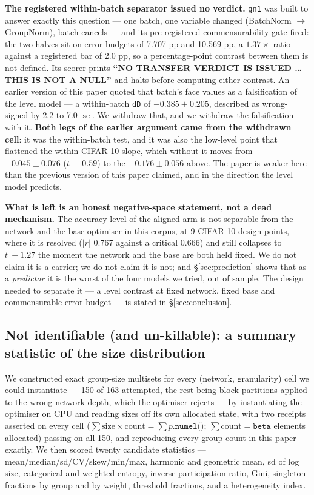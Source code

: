 \documentclass[10pt,letterpaper]{article}
\newcommand{\arm}[1]{\texttt{#1}}
\DeclareMathOperator{\se}{se}
\begin{document}
\textbf{The registered within-batch separator issued no verdict.} \arm{gn1} was built to answer
exactly this question --- one batch, one variable changed (BatchNorm $\rightarrow$ GroupNorm),
batch cancels --- and its pre-registered commensurability gate fired: the two halves sit on error
budgets of 7.707 pp and 10.569 pp, a $1.37\times$ ratio against a registered bar of 2.0 pp, so a
percentage-point contrast between them is not defined. Its scorer prints \textbf{``NO TRANSFER
VERDICT IS ISSUED \ldots{} THIS IS NOT A NULL''} and halts before computing either contrast. An
earlier version of this paper quoted that batch's face values as a falsification of the level
model --- a within-batch \texttt{dD} of $-0.385 \pm 0.205$, described as wrong-signed by 2.2 to
7.0 $\se$. We withdraw that, and we withdraw the falsification with it. \textbf{Both legs of the
earlier argument came from the withdrawn cell}: it was the within-batch test, and it was also the
low-level point that flattened the within-CIFAR-10 slope, which without it moves from
$-0.045 \pm 0.076$ ($t\ -0.59$) to the $-0.176 \pm 0.056$ above. The paper is weaker here than the
previous version of this paper claimed, and in the direction the level model predicts.

\textbf{What is left is an honest negative-space statement, not a dead mechanism.} The accuracy
level of the aligned arm is not separable from the network and the base optimiser in this corpus,
at 9 CIFAR-10 design points, where it is resolved ($|r|$ 0.767 against a critical 0.666) and
still collapses to $t\ -1.27$ the moment the network and the base are both held fixed. We do not
claim it is a carrier; we do
not claim it is not; and \S\ref{sec:prediction} shows that as a \emph{predictor} it is the worst
of the four models we tried, out of sample. The design needed to separate it --- a level contrast
at fixed network, fixed base and commensurable error budget --- is stated in
\S\ref{sec:conclusion}.

\subsection{Not identifiable (and un-killable): a summary statistic of the size distribution}
\label{sec:identifiability}

We constructed exact group-size multisets for every (network, granularity) cell we could
instantiate --- 150 of 163 attempted, the rest being block partitions applied to the wrong network
depth, which the optimiser rejects --- by instantiating the optimiser on CPU and reading sizes off
its own allocated state, with two receipts asserted on every cell
($\sum \text{size} \times \text{count} = \sum p.\texttt{numel()}$;
$\sum \text{count} = \texttt{beta}$ elements allocated) passing on all 150, and reproducing every
group count in this paper exactly. We then scored twenty candidate statistics ---
mean/median/sd/CV/skew/min/max, harmonic and geometric mean, sd of log size, categorical and
weighted entropy, inverse participation ratio, Gini, singleton fractions by group and by weight,
threshold fractions, and a heterogeneity index.
\end{document}
